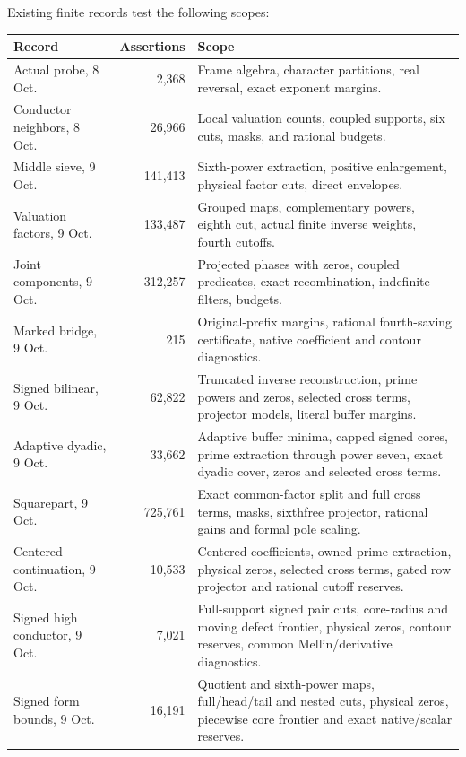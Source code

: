 \documentclass[11pt]{article}
\theoremstyle{definition}
\begin{document}
Existing finite records test the following scopes:
\begin{center}\small
\begin{tabular}{p{.26\linewidth}r p{.53\linewidth}}
\toprule
Record & Assertions & Scope\\
\midrule
Actual probe, 8 Oct. & 2,368 & Frame algebra, character partitions, real reversal, exact exponent margins.\\
Conductor neighbors, 8 Oct. & 26,966 & Local valuation counts, coupled supports, six cuts, masks, and rational budgets.\\
Middle sieve, 9 Oct. & 141,413 & Sixth-power extraction, positive enlargement, physical factor cuts, direct envelopes.\\
Valuation factors, 9 Oct. & 133,487 & Grouped maps, complementary powers, eighth cut, actual finite inverse weights, fourth cutoffs.\\
Joint components, 9 Oct. & 312,257 & Projected phases with zeros, coupled predicates, exact recombination, indefinite filters, budgets.\\
Marked bridge, 9 Oct. & 215 & Original-prefix margins, rational fourth-saving certificate, native coefficient and contour diagnostics.\\
Signed bilinear, 9 Oct. & 62,822 & Truncated inverse reconstruction, prime powers and zeros, selected cross terms, projector models, literal buffer margins.\\
Adaptive dyadic, 9 Oct. & 33,662 & Adaptive buffer minima, capped signed cores, prime extraction through power seven, exact dyadic cover, zeros and selected cross terms.\\
Squarepart, 9 Oct. & 725,761 & Exact common-factor split and full cross terms, masks, sixthfree projector, rational gains and formal pole scaling.\\
Centered continuation, 9 Oct. & 10,533 & Centered coefficients, owned prime extraction, physical zeros, selected cross terms, gated row projector and rational cutoff reserves.\\
Signed high conductor, 9 Oct. & 7,021 & Full-support signed pair cuts, core-radius and moving defect frontier, physical zeros, contour reserves, common Mellin/derivative diagnostics.\\
Signed form bounds, 9 Oct. & 16,191 & Quotient and sixth-power maps, full/head/tail and nested cuts, physical zeros, piecewise core frontier and exact native/scalar reserves.\\
\bottomrule
\end{tabular}
\end{center}
\end{document}
